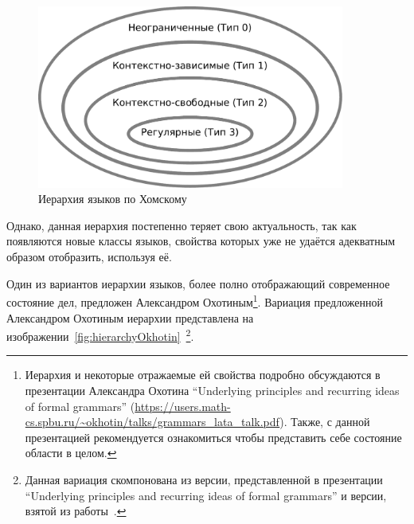 \begin{figure}
  \begin{center}
  \includegraphics[width=0.9\textwidth]{figures/Chomsky.pdf}
  \end{center}
  \caption{Иерархия языков по Хомскому}
  \label{fig:Chomsky}
\end{figure}

Однако, данная иерархия постепенно теряет свою актуальность, так как появляются новые классы языков, свойства которых уже не удаётся адекватным образом отобразить, используя её. 

Один из вариантов иерархии языков, более полно отображающий современное состояние дел, предложен Александром Охотиным\footnote{Иерархия и некоторые отражаемые ей свойства подробно обсуждаются в презентации Александра Охотина ``Underlying principles
and recurring ideas of formal grammars'' (\url{https://users.math-cs.spbu.ru/~okhotin/talks/grammars_lata_talk.pdf}).
Также, с данной презентацией рекомендуется ознакомиться чтобы представить себе состояние области в целом.}.
Вариация предложенной Александром Охотиным иерархии представлена на изображении~\ref{fig:hierarchyOkhotin}~\footnote{Данная вариация скомпонована из версии, представленной в презентации ``Underlying principles
and recurring ideas of formal grammars'' и версии, взятой из работы~\cite{MRYKHIN2023113829}.}.

